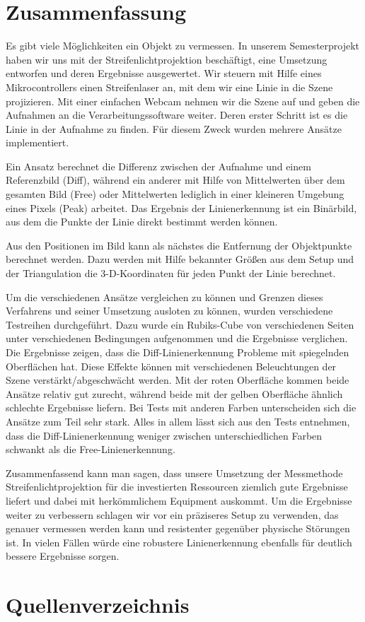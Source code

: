 \documentclass[ngerman,a4paper,parskip=half]{scrartcl}
\begin{document}

\section{Zusammenfassung}
\label{sec:summary}

Es gibt viele Möglichkeiten ein Objekt zu vermessen.
In unserem Semesterprojekt haben wir uns mit der Streifenlichtprojektion beschäftigt, eine Umsetzung entworfen und deren Ergebnisse ausgewertet.
Wir steuern mit Hilfe eines Mikrocontrollers einen Streifenlaser an, mit dem wir eine Linie in die Szene projizieren.
Mit einer einfachen Webcam nehmen wir die Szene auf und geben die Aufnahmen an die Verarbeitungssoftware weiter.
Deren erster Schritt ist es die Linie in der Aufnahme zu finden.
Für diesem Zweck wurden mehrere Ansätze implementiert.

Ein Ansatz berechnet die Differenz zwischen der Aufnahme und einem Referenzbild (Diff), während ein anderer mit Hilfe von Mittelwerten über dem gesamten Bild (Free) oder Mittelwerten lediglich in einer kleineren Umgebung eines Pixels (Peak) arbeitet.
Das Ergebnis der Linienerkennung ist ein Binärbild, aus dem die Punkte der Linie direkt bestimmt werden können.

Aus den Positionen im Bild kann als nächstes die Entfernung der Objektpunkte berechnet werden.
Dazu werden mit Hilfe bekannter Größen aus dem Setup und der Triangulation die 3-D-Koordinaten für jeden Punkt der Linie berechnet.

Um die verschiedenen Ansätze vergleichen zu können und Grenzen dieses Verfahrens und seiner Umsetzung ausloten zu können, wurden verschiedene Testreihen durchgeführt.
Dazu wurde ein Rubiks-Cube von verschiedenen Seiten unter verschiedenen Bedingungen aufgenommen und die Ergebnisse verglichen.
Die Ergebnisse zeigen, dass die Diff-Linienerkennung Probleme mit spiegelnden Oberflächen hat.
Diese Effekte können mit verschiedenen Beleuchtungen der Szene verstärkt/abgeschwächt werden.
Mit der roten Oberfläche kommen beide Ansätze relativ gut zurecht, während beide mit der gelben Oberfläche ähnlich schlechte Ergebnisse liefern.
Bei Tests mit anderen Farben unterscheiden sich die Ansätze zum Teil sehr stark.
Alles in allem lässt sich aus den Tests entnehmen, dass die Diff-Linienerkennung weniger zwischen unterschiedlichen Farben schwankt als die Free-Linienerkennung.

Zusammenfassend kann man sagen, dass unsere Umsetzung der Messmethode Streifenlichtprojektion für die investierten Ressourcen ziemlich gute Ergebnisse liefert und dabei mit herkömmlichem Equipment auskommt.
Um die Ergebnisse weiter zu verbessern schlagen wir vor ein präziseres Setup zu verwenden, das genauer vermessen werden kann und resistenter gegenüber physische Störungen ist. In vielen Fällen würde eine robustere Linienerkennung ebenfalls für deutlich bessere Ergebnisse sorgen.


\section{Quellenverzeichnis}

\end{document}
